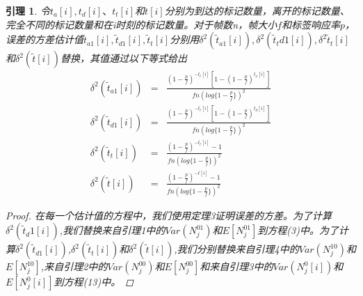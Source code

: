 \documentclass[UTF8]{ctexart}
\newtheorem{lemma}{引理}
\newtheorem*{proof}{证明}
\begin{document}
	\begin{lemma}
		令$t_a[i],t_d[i]、t_t[i]$和$t[i]$分别为到达的标记数量，离开的标记数量、完全不同的标记数量和在i时刻的标记数量。对于帧数n，帧大小$f$和标签响应率$p$，误差的方差估计值$\widetilde{t}_{a1}[i],\widetilde{t}_{d1}[i],\widetilde{t}_t[i]$分别用$\delta^2(\widetilde{t}_{a1}[i]),\delta^2(\widetilde{t}_t{d1}[i]),\delta^2{\widetilde{t}_t[i]}$和$\delta^2(\widetilde{t}[i])$替换，其值通过以下等式给出
		\begin{eqnarray*}
			\delta^2(\widetilde{t}_{a1}[i])&=&\frac{(1-\frac{p}{f})^{-t_t[i]}[1-(1-\frac{p}{f})^{t_a[i]}]}{fn(log\{1-\frac{p}{f}\})^2}\\
			\delta^2(\widetilde{t}_{d1}[i])&=&\frac{(1-\frac{p}{f})^{-t_t[i]}[1-(1-\frac{p}{f})^{t_d[i]}]}{fn(log\{1-\frac{p}{f}\})^2}\\
			\delta^2(\widetilde{t}_t[i])&=&\frac{(1-\frac{p}{f})^{-t_t[i]}-1}{fn(log\{1-\frac{p}{f}\})^2}\\
			\delta^2(\widetilde{t}[i])&=&\frac{(1-\frac{p}{f})^{-t[i]}-1}{fn(log\{1-\frac{p}{f}\})^2}
		\end{eqnarray*}
		\begin{proof}
			在每一个估计值的方程中，我们使用定理3证明误差的方差。为了计算$\delta^2(\widetilde{t}_d1[i])$,我们替换来自引理1中的$Var(N^{01}_j)$和$E[N^{01}_j]$到方程(3)中。为了计算$\delta^2(\widetilde{t}_{d1}[i])$,$\delta^2(\widetilde{t}_t[i])$和$\delta^2(\widetilde{t}[i])$,我们分别替换来自引理4中的$Var(N^{10}_j)$和$E[N^{10}_j]$,来自引理2中的$Var(N^{00}_j)$和$E[N^{00}_j]$和来自引理3中的$Var(N^0_j[i])$和$E[N^0_j[i]]$到方程(13)中。
		\end{proof}
	\end{lemma}
\end{document}
